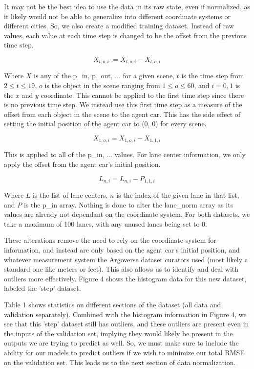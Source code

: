 \documentclass{article}
\begin{document}
It may not be the best idea to use the data in its raw state, even if normalized, as it likely would not be able to generalize into different coordinate systems or different cities. So, we also create a modified training dataset. Instead of raw values, each value at each time step is changed to be the offset from the previous time step.

$$ X_{t, o, i} := X_{t, o, i} - X_{t, o, i} $$

Where $X$ is any of the p\_in, p\_out, ... for a given scene, $t$ is the time step from $2 \leq t \leq 19$, $o$ is the object in the scene ranging from $1 \leq o \leq 60$, and $i=0,1$ is the $x$ and $y$ coordinate. This cannot be applied to the first time step since there is no previous time step. We instead use this first time step as a measure of the offset from each object in the scene to the agent car. This has the side effect of setting the initial position of the agent car to (0, 0) for every scene.

$$ X_{1, o, i} = X_{1, o, i} - X_{1, 1, i} $$

This is applied to all of the p\_in, ... values. For lane center information, we only apply the offset from the agent car's initial position.

$$ L_{n, i} = L_{n, i} - P_{1, 1, i} $$

Where $L$ is the list of lane centers, $n$ is the index of the given lane in that list, and $P$ is the p\_in array. Nothing is done to alter the lane\_norm array as its values are already not dependant on the coordinate system. For both datasets, we take a maximum of 100 lanes, with any unused lanes being set to 0.

These alterations remove the need to rely on the coordinate system for information, and instead are only based on the agent car's initial position, and whatever measurement system the Argoverse dataset curators used (most likely a standard one like meters or feet). This also allows us to identify and deal with outliers more effectively. Figure 4 shows the histogram data for this new dataset, labeled the 'step' dataset.

Table 1 shows statistics on different sections of the dataset (all data and validation separately). Combined with the histogram information in Figure 4, we see that this 'step' dataset still has outliers, and these outliers are present even in the inputs of the validation set, implying they would likely be present in the outputs we are trying to predict as well. So, we must make sure to include the ability for our models to predict outliers if we wish to minimize our total RMSE on the validation set. This leads us to the next section of data normalization.
\end{document}
